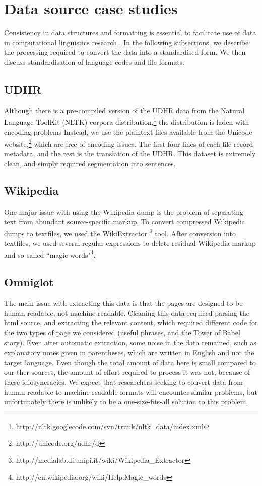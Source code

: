 \section{Data source case studies} \label{sec:case_studies}
Consistency in data structures and formatting is essential to facilitate use of data in computational linguistics research \cite{palmer2010lilt}. In the following subsections, we describe the processing required to convert the data into a standardised form.  We then discuss standardisation of language codes and file formats.

\subsection{UDHR}

Although there is a pre-compiled version of the UDHR data from the
Natural Language ToolKit (NLTK) corpora
distribution,\footnote{http://nltk.googlecode.com/svn/trunk/nltk\_data/index.xml}
the distribution is laden with encoding problems 
Instead, we use the
plaintext files available from the Unicode
website,\footnote{http://unicode.org/udhr/d} which are free of
encoding issues. The first four lines of each file record metadata,
and the rest is the translation of the UDHR. This dataset is
extremely clean, and simply required segmentation into sentences.


\subsection{Wikipedia}

One major issue with using the Wikipedia dump is the problem of separating text from abundant source-specific markup. To convert compressed
Wikipedia dumps to textfiles, we used the WikiExtractor
\footnote{http://medialab.di.unipi.it/wiki/Wikipedia\_Extractor}
tool. After conversion into textfiles, we used several regular expressions to
delete residual Wikipedia markup and so-called ``magic
words"\footnote{http://en.wikipedia.org/wiki/Help:Magic\_words}.


\subsection{Omniglot}


The main issue with extracting this data is that the pages are designed to be human-readable, not machine-readable.  Cleaning this data required parsing the html source, and extracting the relevant content, which required different code for the two types of page we considered (useful phrases, and the Tower of Babel story).  Even after automatic extraction, some noise in the data remained, such as explanatory notes given in parentheses, which are written in English and not the target language.  Even though the total amount of data here is small compared to our ther sources, the amount of effort required to process it was not, because of these idiosyncracies.  We expect that researchers seeking to convert data from human-readable to machine-readable formats will encounter similar problems, but unfortunately there is unlikely to be a one-size-fits-all solution to this problem.


